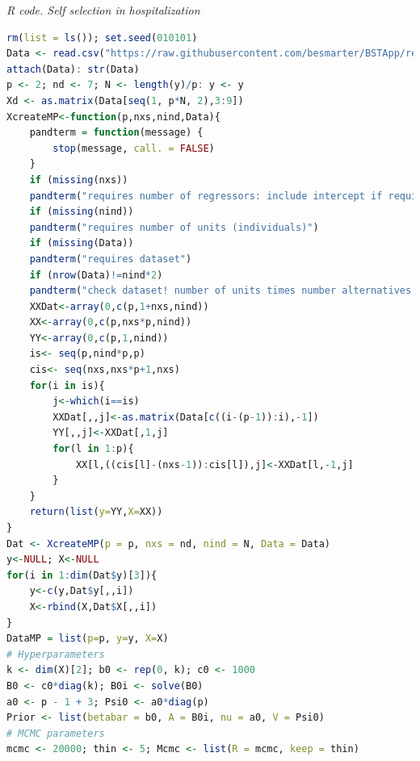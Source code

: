\begin{tcolorbox}[enhanced,width=4.67in,center upper,
	fontupper=\large\bfseries,drop shadow southwest,sharp corners]
	\textit{R code. Self selection in hospitalization}
	\begin{VF}
		\begin{lstlisting}[language=R]
rm(list = ls()); set.seed(010101)
Data <- read.csv("https://raw.githubusercontent.com/besmarter/BSTApp/refs/heads/master/DataApp/7HealthMed.csv", sep = ",", header = TRUE, quote = "")
attach(Data): str(Data)
p <- 2; nd <- 7; N <- length(y)/p: y <- y
Xd <- as.matrix(Data[seq(1, p*N, 2),3:9])
XcreateMP<-function(p,nxs,nind,Data){
	pandterm = function(message) {
		stop(message, call. = FALSE)
	}
	if (missing(nxs)) 
	pandterm("requires number of regressors: include intercept if required")
	if (missing(nind)) 
	pandterm("requires number of units (individuals)")
	if (missing(Data)) 
	pandterm("requires dataset")
	if (nrow(Data)!=nind*2)
	pandterm("check dataset! number of units times number alternatives should be equal to dataset rows")
	XXDat<-array(0,c(p,1+nxs,nind))
	XX<-array(0,c(p,nxs*p,nind))
	YY<-array(0,c(p,1,nind))
	is<- seq(p,nind*p,p)
	cis<- seq(nxs,nxs*p+1,nxs)
	for(i in is){
		j<-which(i==is)
		XXDat[,,j]<-as.matrix(Data[c((i-(p-1)):i),-1])
		YY[,,j]<-XXDat[,1,j]
		for(l in 1:p){
			XX[l,((cis[l]-(nxs-1)):cis[l]),j]<-XXDat[l,-1,j]
		}
	}
	return(list(y=YY,X=XX))
}
Dat <- XcreateMP(p = p, nxs = nd, nind = N, Data = Data)
y<-NULL; X<-NULL
for(i in 1:dim(Dat$y)[3]){
	y<-c(y,Dat$y[,,i])
	X<-rbind(X,Dat$X[,,i])
}
DataMP = list(p=p, y=y, X=X)
# Hyperparameters
k <- dim(X)[2]; b0 <- rep(0, k); c0 <- 1000
B0 <- c0*diag(k); B0i <- solve(B0)
a0 <- p - 1 + 3; Psi0 <- a0*diag(p)
Prior <- list(betabar = b0, A = B0i, nu = a0, V = Psi0)
# MCMC parameters
mcmc <- 20000; thin <- 5; Mcmc <- list(R = mcmc, keep = thin)
\end{lstlisting}
	\end{VF}
\end{tcolorbox}


